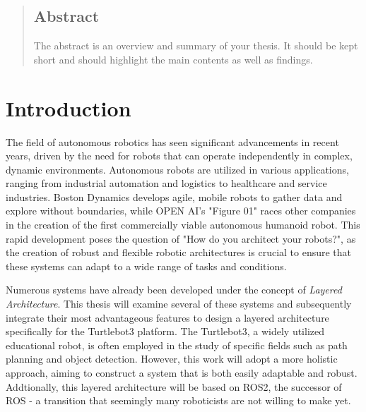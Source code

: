 \documentclass[%
paper=A4,               %
twoside=true,           %
openright,              %
11pt,                   %
bibliography=totoc,     %
titlepage=on,           %
DIV=12,                 %
BCOR=1.5cm,             %
parskip=half,            %
final
]{scrreprt}
\begin{document}
	\onehalfspacing
	\begin{titlepage}
		
	\end{titlepage}
	


	\tableofcontents
	\cleardoublepage

	\begin{abstract}
		\section*{Abstract}
	The abstract is an overview and summary of your thesis. It should be kept short and should highlight the main contents as well as findings. 
	
	\end{abstract}
	
	
	\chapter{Introduction}
	The field of autonomous robotics has seen significant advancements in recent years, driven by the need for robots that can operate independently in complex, dynamic environments. Autonomous robots are utilized in various applications, ranging from industrial automation and logistics to healthcare and service industries. Boston Dynamics develops agile, mobile robots to gather data and explore without boundaries, while OPEN AI's "Figure 01" races other companies in the creation of the first commercially viable autonomous humanoid robot. This rapid development poses the question of "How do you architect your robots?",
	as the creation of robust and flexible robotic architectures is crucial to ensure that these systems can adapt to a wide range of tasks and conditions. \newline
	
	Numerous systems have already been developed under the concept of \textit{Layered Architecture}. This thesis will examine several of these systems and subsequently integrate their most advantageous features to design a layered architecture specifically for the Turtlebot3 platform. The Turtlebot3, a widely utilized educational robot, is often employed in the study of specific fields such as path planning and object detection. However, this work will adopt a more holistic approach, aiming to construct a system that is both easily adaptable and robust. Addtionally, this layered architecture will be based on ROS2, the successor of ROS - a transition that seemingly many roboticists are not willing to make yet. 
	
\end{document}
